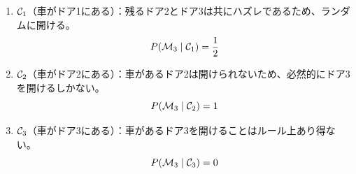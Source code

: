 \begin{enumerate}[label=(\roman*)]
    \item $\mathcal{C}_1$（車がドア1にある）：残るドア2とドア3は共にハズレであるため、ランダムに開ける。
        \begin{equation}
            P( \mathcal{M}_3 \mid \mathcal{C}_1 ) = \frac{1}{2}
        \end{equation}
    \item $\mathcal{C}_2$（車がドア2にある）：車があるドア2は開けられないため、必然的にドア3を開けるしかない。
        \begin{equation}
            P( \mathcal{M}_3 \mid \mathcal{C}_2 ) = 1
        \end{equation}
    \item $\mathcal{C}_3$（車がドア3にある）：車があるドア3を開けることはルール上あり得ない。
        \begin{equation}
            P( \mathcal{M}_3 \mid \mathcal{C}_3 ) = 0
        \end{equation}
\end{enumerate}

